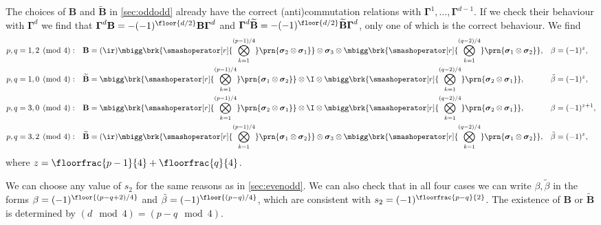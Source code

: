 \documentclass[11pt]{article}
\newcommand{\Gammab}{\boldsymbol{\Gamma}}
\newcommand{\B}{\mathbf{B}}
\newcommand{\Bt}{\widetilde{\B}}
\newcommand{\sigmab}{\boldsymbol{\sigma}}
\newcommand{\betat}{\tilde{\beta}}
\begin{document}
The choices of $\B$ and $\Bt$ in \cref{sec:oddodd} already have the correct (anti)commutation relations with $\Gammab^1, \ldots, \Gammab^{d-1}$.
If we check their behaviour with $\Gammab^d$ we find that $\Gammab^d \B = -(-1)^{\floor{d/2}}\B \Gammab^d$ and $\Gammab^d \Bt = -(-1)^{\floor{d/2}}\Bt \Gammab^d$, only one of which is the correct behaviour.
We find
%
\begin{equation*}
\begin{aligned}
  p, q &= 1, 2 \pmod 4: &
  \B &= (\ir)
        \mbigg\brk{\smashoperator[r]{\bigotimes_{k=1}^{(p-1)/4}}
        \prn{\sigmab_2 \otimes \sigmab_1}} \otimes
        \sigmab_3 \otimes
        \mbigg\brk{\smashoperator[r]{\bigotimes_{k=1}^{(q-2)/4}}
        \prn{\sigmab_1 \otimes \sigmab_2}}, &
  \beta &= (-1)^{z}, \\
  p, q &= 1, 0 \pmod 4: &
  \Bt &=
        \mbigg\brk{\smashoperator[r]{\bigotimes_{k=1}^{(p-1)/4}}
        \prn{\sigmab_1 \otimes \sigmab_2}} \otimes
        \I \otimes
        \mbigg\brk{\smashoperator[r]{\bigotimes_{k=1}^{(q-2)/4}}
        \prn{\sigmab_2 \otimes \sigmab_1}}, &
  \betat &= (-1)^{z}, \\
  p, q &= 3, 0 \pmod 4: &
  \B &=
        \mbigg\brk{\smashoperator[r]{\bigotimes_{k=1}^{(p-1)/4}}
        \prn{\sigmab_2 \otimes \sigmab_1}} \otimes
        \I \otimes
        \mbigg\brk{\smashoperator[r]{\bigotimes_{k=1}^{(q-2)/4}}
        \prn{\sigmab_2 \otimes \sigmab_1}}, &
  \beta &= (-1)^{z+1}, \\
  p, q &= 3, 2 \pmod 4: &
  \Bt &= (\ir)
        \mbigg\brk{\smashoperator[r]{\bigotimes_{k=1}^{(p-1)/4}}
        \prn{\sigmab_1 \otimes \sigmab_2}} \otimes
        \sigmab_3 \otimes
        \mbigg\brk{\smashoperator[r]{\bigotimes_{k=1}^{(q-2)/4}}
        \prn{\sigmab_1 \otimes \sigmab_2}}, &
  \betat &= (-1)^{z}, \\
\end{aligned}
\end{equation*}
%
where \(z = \floorfrac{p-1}{4} + \floorfrac{q}{4}\).

We can choose any value of $s_2$ for the same reasons as in \cref{sec:evenodd}.
We can also check that in all four cases we can write $\beta, \betat$ in the forms $\beta = (-1)^{\floor{(p-q+2)/4}}$ and $\betat = (-1)^{\floor{(p-q)/4}}$, 
which are consistent with \(s_2 = (-1)^{\floorfrac{p-q}{2}}\).
The existence of $\B$ or $\Bt$ is determined by $(d \mod 4) = (p-q \mod 4)$.
\end{document}
